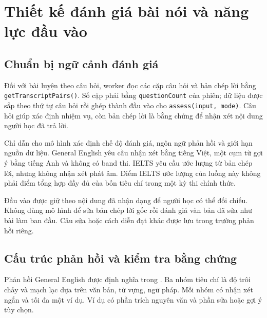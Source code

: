 \documentclass[12pt,a4paper,oneside]{report}
\begin{document}
\section{Thiết kế đánh giá bài nói và năng lực đầu vào}

\subsection{Chuẩn bị ngữ cảnh đánh giá}

Đối với bài luyện theo câu hỏi, worker đọc các cặp câu hỏi và bản chép lời bằng \texttt{getTranscriptPairs()}. Số cặp phải bằng \texttt{questionCount} của phiên; dữ liệu được sắp theo thứ tự câu hỏi rồi ghép thành đầu vào cho \texttt{assess(input, mode)}. Câu hỏi giúp xác định nhiệm vụ, còn bản chép lời là bằng chứng để nhận xét nội dung người học đã trả lời.

Chỉ dẫn cho mô hình xác định chế độ đánh giá, ngôn ngữ phản hồi và giới hạn nguồn dữ liệu. General English yêu cầu nhận xét bằng tiếng Việt, một cụm từ gợi ý bằng tiếng Anh và không có band thi. IELTS yêu cầu ước lượng từ bản chép lời, nhưng không nhận xét phát âm. Điểm IELTS ước lượng của luồng này không phải điểm tổng hợp đầy đủ của bốn tiêu chí trong một kỳ thi chính thức.

Đầu vào được giữ theo nội dung đã nhận dạng để người học có thể đối chiếu. Không dùng mô hình để sửa bản chép lời gốc rồi đánh giá văn bản đã sửa như bài làm ban đầu. Câu sửa hoặc cách diễn đạt khác được lưu trong trường phản hồi riêng.

\subsection{Cấu trúc phản hồi và kiểm tra bằng chứng}

Phản hồi General English được định nghĩa trong . Ba nhóm tiêu chí là độ trôi chảy và mạch lạc dựa trên văn bản, từ vựng, ngữ pháp. Mỗi nhóm có nhận xét ngắn và tối đa một ví dụ. Ví dụ có phần trích nguyên văn và phần sửa hoặc gợi ý tùy chọn.
\end{document}
